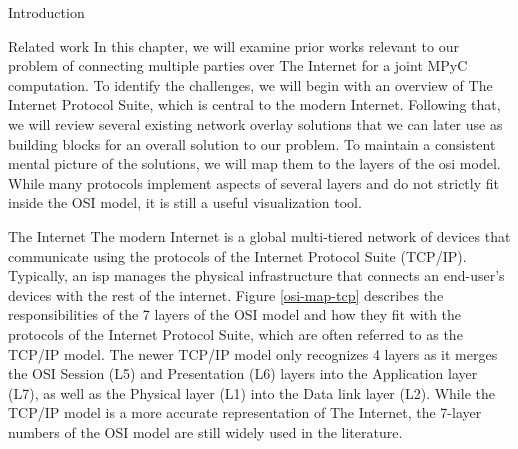 \begin{frame}
\hypertarget{thesis__001-preamble.md}{}
\tableofcontents

\printnoidxglossary[type=\acronymtype,title=List of Abbreviations]
\listoffigures

\mainmatter
\end{frame}

\hypertarget{thesis__010-intro.md}{}
\begin{frame}{Introduction}
\protect\hypertarget{thesis__010-intro.md__introduction}{}
\end{frame}

\hypertarget{thesis__020-related-work.md}{}
\begin{frame}[fragile]{Related work}
\protect\hypertarget{thesis__020-related-work.md__related-work}{}
In this chapter, we will examine prior works relevant to our problem of
connecting multiple parties over The Internet for a joint MPyC
computation. To identify the challenges, we will begin with an overview
of The Internet Protocol Suite, which is central to the modern Internet.
Following that, we will review several existing network overlay
solutions that we can later use as building blocks for an overall
solution to our problem. To maintain a consistent mental picture of the
solutions, we will map them to the layers of the \gls{osi} model. While
many protocols implement aspects of several layers and do not strictly
fit inside the OSI model, it is still a useful visualization tool.

\begin{block}{The Internet}
\protect\hypertarget{thesis__020-related-work.md__the-internet}{}
The modern Internet is a global multi-tiered network of devices that
communicate using the protocols of the Internet Protocol Suite (TCP/IP).
Typically, an \gls{isp} manages the physical infrastructure that
connects an end-user's devices with the rest of the internet. Figure
\ref{osi-map-tcp} describes the responsibilities of the 7 layers of the
OSI model and how they fit with the protocols of the Internet Protocol
Suite, which are often referred to as the TCP/IP model. The newer TCP/IP
model only recognizes 4 layers as it merges the OSI Session (L5) and
Presentation (L6) layers into the Application layer (L7), as well as the
Physical layer (L1) into the Data link layer (L2). While the TCP/IP
model is a more accurate representation of The Internet, the 7-layer
numbers of the OSI model are still widely used in the literature.


\end{block}
\end{frame}
